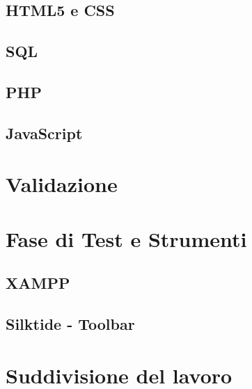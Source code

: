 \documentclass[a4paper, dvipsnames, table]{article}
\begin{document}
		\subsection{HTML5 e CSS}
		\subsection{SQL}
		\subsection{PHP}
		\subsection{JavaScript}

\newpage
\section{Validazione}%

\newpage
\section{Fase di Test e Strumenti}%
	\subsection{XAMPP}
	\subsection*{Silktide - Toolbar}	
	
\newpage
\section{Suddivisione del lavoro}
\end{document}

